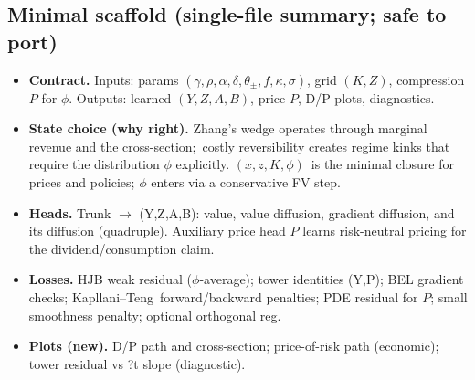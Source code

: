 \documentclass[11pt,letterpaper,oneside]{article}
\numberwithin{equation}{section}
\newcommand{\1}{\mathbf{1}}
\begin{document}
\subsection*{Minimal scaffold (single-file summary; safe to port)}
\begin{tcolorbox}[didacticstyle]
\begin{itemize}[leftmargin=1.15em,itemsep=0.25em]
  \item \textbf{Contract.} Inputs: params $(\gamma,\rho,\alpha,\delta,\theta_\pm, f,\kappa,\sigma)$, grid $(K,Z)$,
        compression $P$ for $\phi$. Outputs: learned $(Y,Z,A,B)$, price $P$, D/P plots, diagnostics.
  \item \textbf{State choice (why right).} Zhang's wedge operates through marginal revenue and the cross-section;\
    costly reversibility creates regime kinks that require the distribution $\phi$ explicitly. $(x,z,K,\phi)$\
        is the minimal closure for prices and policies; $\phi$ enters via a conservative FV step.
  \item \textbf{Heads.} Trunk $\to$ (Y,Z,A,B): value, value diffusion, gradient diffusion, and its diffusion (quadruple).
    Auxiliary price head $P$ learns risk-neutral pricing for the dividend/consumption claim.
  \item \textbf{Losses.} HJB weak residual ($\phi$-average); tower identities (Y,P); BEL gradient checks; Kapllani--Teng\
        forward/backward penalties; PDE residual for $P$; small smoothness penalty; optional orthogonal reg.
  \item \textbf{Plots (new).} D/P path and cross-section; price-of-risk path (economic); tower residual vs ?t slope (diagnostic).
\end{itemize}
\end{tcolorbox}
\end{document}
